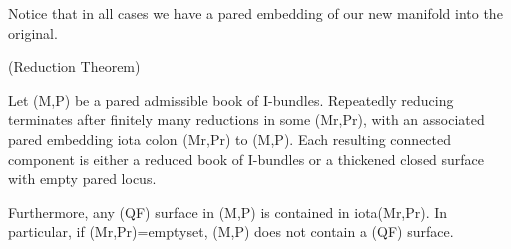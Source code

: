 Notice that in all cases we have a pared embedding of our new manifold into the
original.

\begin{thm}(Reduction Theorem)

Let (M,P) be a pared admissible book of I-bundles. Repeatedly reducing
terminates after finitely many reductions in some (Mr,Pr), with an associated
pared embedding iota colon (Mr,Pr) to (M,P). Each resulting connected component
is either a reduced book of I-bundles or a thickened closed surface with empty
pared locus.

Furthermore, any (QF) surface in (M,P) is contained in iota(Mr,Pr). In
particular, if (Mr,Pr)=emptyset, (M,P) does not contain a (QF) surface.

\end{thm}

